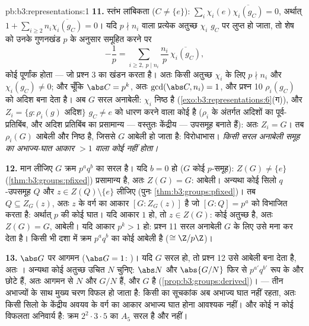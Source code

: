 \begin{solution}{pb:b3:representations:1}
\textbf{11.} स्तंभ लांबिकता ($C \neq \{e\}$): $\sum_i \chi_i(e)\overline{\chi_i(g_C)} = 0$, अर्थात् $1 +
\sum_{i \geq 2} n_i\overline{\chi_i(g_C)} = 0$। यदि
$p \nmid n_i$ वाला प्रत्येक अतुच्छ $\chi_i$ $g_C$ पर लुप्त हो जाता, तो शेष को
उनके गुणनखंड $p$ के अनुसार समूहित करने पर
\[
-\frac1p = \sum_{i \geq 2,\ p \mid n_i}
\frac{n_i}{p}\,\overline{\chi_i(g_C)},
\]
कोई  पूर्णांक होता --- जो प्रश्न 3 का खंडन करता है। अतः किसी
अतुच्छ $\chi_i$ के लिए $p \nmid n_i$ और $\chi_i(g_C) \neq 0$; और चूँकि $\abs C = p^k$, अतः $\gcd(\abs C, n_i) = 1$, और
प्रश्न 10 $\rho_i(g_C)$ को अदिश बना देता है। अब $G$ सरल अनाबेली: $\chi_i$
निष्ठ है (\cref{exo:b3:representations:6}(ग)), और $Z_i = \{g : \rho_i(g) \text{ अदिश}\}$ $g_C \neq e$ को धारण करने वाला कोई  है ($\rho_i$ के अंतर्गत अदिशों का पूर्व-प्रतिबिंब, और अदिश
प्रतिबिंब का प्रसामान्य --- वस्तुतः केंद्रीय --- उपसमूह बनाते हैं):
अतः $Z_i = G$। तब $\rho_i(G)$ आबेली और निष्ठ है, जिससे $G$ आबेली हो जाता
है: विरोधाभास। \emph{किसी सरल अनाबेली समूह का अभाज्य-घात आकार $> 1$
वाला कोई  नहीं होता।}

\textbf{12.} मान लीजिए $G$ क्रम $p^aq^b$ का सरल है। यदि $b = 0$ हो
($G$ कोई $p$-समूह): $Z(G) \neq \{e\}$ (\cref{thm:b3:groups:pfixed}) प्रसामान्य है, अतः $Z(G) = G$:
आबेली। अन्यथा कोई सिलो $q$-उपसमूह $Q$ और $z \in Z(Q)
\setminus\{e\}$ लीजिए (पुनः
\cref{thm:b3:groups:pfixed})। तब $Q
\subseteq Z_G(z)$, अतः $z$ के वर्ग का आकार $[G : Z_G(z)]$ है जो $[G : Q] = p^a$ को
विभाजित करता है: अर्थात् $p$ की कोई घात। यदि आकार $1$ हो, तो
$z \in Z(G)$:  कोई अतुच्छ  है, अतः $Z(G) = G$, आबेली।
यदि आकार $p^k > 1$ हो: प्रश्न 11 सरल अनाबेली $G$ के लिए उसे मना कर
देता है। किसी भी दशा में क्रम $p^aq^b$ का कोई  आबेली है ($\cong \Z/p\Z$)।

\textbf{13.} $\abs G$ पर आगमन ($\abs G = 1$: )। यदि $G$ सरल हो, तो
प्रश्न 12 उसे आबेली बना देता है, अतः । अन्यथा कोई अतुच्छ उचित
 $N$ चुनिए: $\abs
N$ और $\abs{G/N}$ फिर से $p^{a'}q^{b'}$ रूप के
और छोटे हैं, अतः आगमन से $N$ और $G/N$  हैं, और $G$ 
है (\cref{prop:b3:groups:derived})। --- तीन अभाज्यों के साथ मुख्य चरण विफल हो जाता है: किसी
 का सूचकांक अब अभाज्य घात नहीं रहता, अतः किसी सिलो के
केंद्रीय अवयव के वर्ग का आकार अभाज्य घात होना आवश्यक नहीं। और कोई
न कोई विफलता अनिवार्य है: क्रम $2^2\cdot3\cdot5$ का $A_5$ सरल है और  नहीं।


\end{solution}
